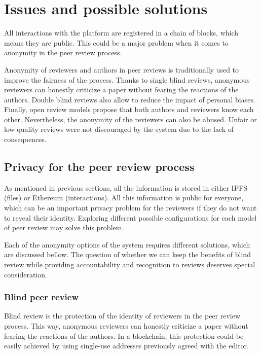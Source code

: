 \section{Issues and possible solutions}
\label{sec:privacyReview}

All interactions with the platform are registered in a chain of blocks, which
means they are public. This could be a major problem when it comes to anonymity
in the peer review process.

Anonymity of reviewers and authors in peer reviews is traditionally used to
improve the fairness of the process. Thanks to single blind reviews, anonymous
reviewers can honestly criticize a paper without fearing the reactions of the
authors. Double blind reviews also allow to reduce the impact of personal
biases. Finally, open review models propose that both authors and reviewers know
each other. Nevertheless, the anonymity of the reviewers can also
be abused. Unfair or low quality reviews were not discouraged by the system due
to the lack of consequences.

\subsection{Privacy for the peer review process}
\label{sec:privacy-peer-review}

As mentioned in previous sections, all the information is stored in either IPFS
(files) or Ethereum (interactions). All this information is public for everyone,
which can be an important privacy problem for the reviewers if they do not want
to reveal their identity. Exploring different possible configurations for each
model of peer review may solve this problem.

Each of the anonymity options of the system requires different solutions, which
are discussed bellow. The question of whether we can keep the benefits of blind
review while providing accountability and recognition to reviews deserves
special consideration.

\subsubsection*{Blind peer review}
Blind review is the protection of the identity of reviewers in the peer review
process. This way, anonymous reviewers can honestly criticize a paper without
fearing the reactions of the authors. In a blockchain, this protection could be
easily achieved by using single-use addresses previously agreed with the editor.

